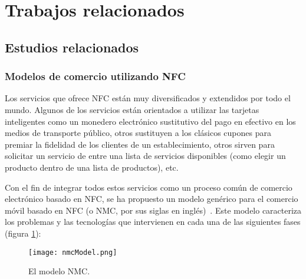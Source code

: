 \section{Trabajos relacionados}
  \subsection{Estudios relacionados}
  \label{subsec:related}
    \subsubsection{Modelos de comercio utilizando NFC}
  Los servicios que ofrece \acs{NFC} están muy diversificados y extendidos
  por todo el mundo. Algunos de los servicios están orientados a utilizar
  las tarjetas inteligentes como un monedero electrónico sustitutivo del
  pago en efectivo en los medios de transporte público, otros sustituyen
  a los clásicos cupones para premiar la fidelidad de los clientes de un
  establecimiento, otros sirven para solicitar un servicio de entre una
  lista de servicios disponibles (como elegir un producto dentro de una
  lista de productos), etc.

  Con el fin de integrar todos estos servicios como un proceso común de
  comercio electrónico basado en NFC, se ha propuesto un modelo genérico
  para el comercio móvil basado en \acs{NFC} (o \acs{NMC}, por sus siglas
  en inglés)~\cite{bib:nfcCommerce}. Este modelo caracteriza los problemas y
  las tecnologías que intervienen en cada una de las siguientes fases
  (figura \ref{fig:nmcModel}):

  \begin{figure}[!h]
    \begin{center}
      \texttt{[image: nmcModel.png]}
      \caption{El modelo \acs{NMC}.}
      \label{fig:nmcModel}
    \end{center}
  \end{figure}

